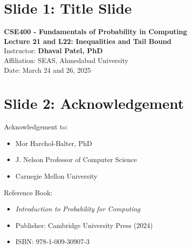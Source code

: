 \documentclass[12pt]{article}
\begin{document}
\section*{Slide 1: Title Slide}
\textbf{CSE400 - Fundamentals of Probability in Computing} \\
\textbf{Lecture 21 and L22: Inequalities and Tail Bound} \\
Instructor: \textbf{Dhaval Patel, PhD} \\
Affiliation: SEAS, Ahmedabad University \\
Date: March 24 and 26, 2025  

\section*{Slide 2: Acknowledgement}
Acknowledgement to:  
\begin{itemize}
\item Mor Harchol-Balter, PhD  
\item J. Nelson Professor of Computer Science  
\item Carnegie Mellon University  
\end{itemize}

Reference Book:  
\begin{itemize}
\item \textit{Introduction to Probability for Computing}  
\item Publisher: Cambridge University Press (2024)  
\item ISBN: 978-1-009-30907-3  
\end{itemize}
\end{document}

